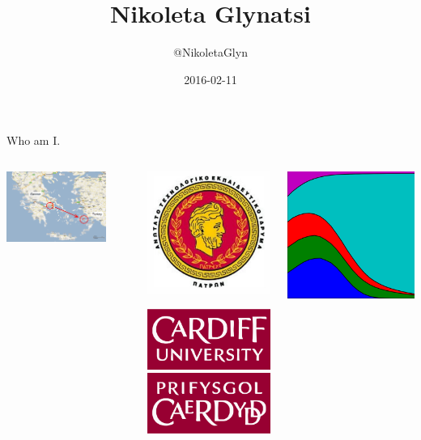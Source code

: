 \documentclass{beamer}
\title{Nikoleta Glynatsi}
\author{@NikoletaGlyn}
\date{2016-02-11}
\begin{document}
\frame{\titlepage}

\begin{frame}{Who am I.}
\begin{columns}[T] %
\begin{column}{.58\textwidth}
  		\includegraphics[width=0.8\textwidth]{static/kos-island-map.png}
\end{column}%
\begin{column}{.38\textwidth}
  		\includegraphics[width=.30\textwidth]{static/tei-patras-logo.jpg}

  		\includegraphics[width=.30\textwidth]{static/cardiff_uni_logo.jpg}
\end{column}%
\begin{column}{.38\textwidth}
  		\includegraphics[width=.30\textwidth]{static/axelrod-logo.png}


\end{column}
\end{columns}
\end{frame}
\end{document}
